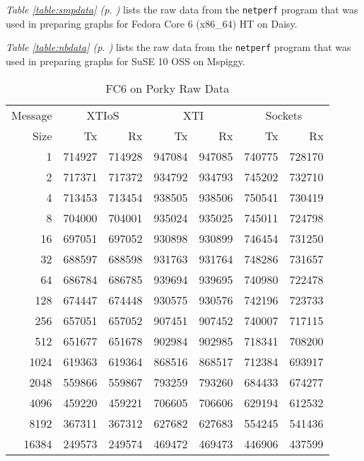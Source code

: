 \documentclass[letterpaper,final,notitlepage,twocolumn,10pt,twoside]{article}
\let\normalsize\small
\let\small\footnotesize
\let\footnotesize\scriptsize
\let\scriptsize\tiny
\begin{document}
\begin{appendix}
\textit{Table \ref{table:smpdata} (p. \pageref{table:smpdata})} lists the raw
data from the \texttt{netperf} program that was used in preparing graphs for
Fedora Core 6 (x86\_64) HT on Daisy.

\textit{Table \ref{table:nbdata} (p. \pageref{table:nbdata})} lists the raw
data from the \texttt{netperf} program that was used in preparing graphs for
SuSE 10 OSS on Mspiggy.

\begin{table}[hbp]
\normalsize
\begin{center}
\setlength{\tabcolsep}{0.3em}
\setlength{\arraycolsep}{0.3em}
\begin{tabular}{rrrrrrr}\\
Message & \multicolumn{2}{c}{XTIoS} & \multicolumn{2}{c}{XTI} & \multicolumn{2}{c}{Sockets}\\
Size & Tx & Rx & Tx & Rx & Tx & Rx\\
\hline
\hline
1 & 714927 & 714928 & 947084 & 947085 & 740775 & 728170\\
2 & 717371 & 717372 & 934792 & 934793 & 745202 & 732710\\
4 & 713453 & 713454 & 938505 & 938506 & 750541 & 730419\\
8 & 704000 & 704001 & 935024 & 935025 & 745011 & 724798\\
16 & 697051 & 697052 & 930898 & 930899 & 746454 & 731250\\
32 & 688597 & 688598 & 931763 & 931764 & 748286 & 731657\\
64 & 686784 & 686785 & 939694 & 939695 & 740980 & 722478\\
128 & 674447 & 674448 & 930575 & 930576 & 742196 & 723733\\
256 & 657051 & 657052 & 907451 & 907452 & 740007 & 717115\\
512 & 651677 & 651678 & 902984 & 902985 & 718341 & 708200\\
1024 & 619363 & 619364 & 868516 & 868517 & 712384 & 693917\\
2048 & 559866 & 559867 & 793259 & 793260 & 684433 & 674277\\
4096 & 459220 & 459221 & 706605 & 706606 & 629194 & 612532\\
8192 & 367311 & 367312 & 627682 & 627683 & 554245 & 541436\\
16384 & 249573 & 249574 & 469472 & 469473 & 446906 & 437599\\
\hline
\end{tabular}
\end{center}
\normalsize
\caption[FC6 on Porky Raw Data]{FC6 on Porky Raw Data}
\label{table:fc6data}
\end{table}


\end{appendix}
\end{document}
